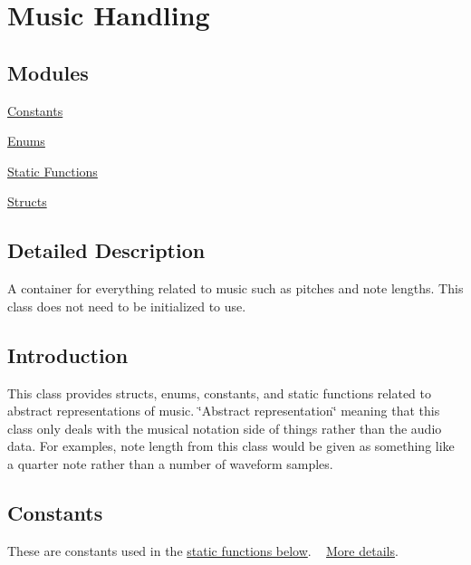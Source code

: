 \hypertarget{group___music_group}{}\section{Music Handling}
\label{group___music_group}
\subsection*{Modules}
\begin{DoxyCompactItemize}
\item 
\hyperlink{group___music_constants}{Constants}
\item 
\hyperlink{group___music_enums}{Enums}
\item 
\hyperlink{group___music_stat_func}{Static Functions}
\item 
\hyperlink{group___music_structs}{Structs}
\end{DoxyCompactItemize}


\subsection{Detailed Description}


A container for everything related to music such as pitches and note lengths. This class does not need to be initialized to use.\hypertarget{group___music_group_DocMusicIntro}{}\subsection{Introduction}\label{group___music_group_DocMusicIntro}
This class provides structs, enums, constants, and static functions related to abstract representations of music. \char`\"{}\+Abstract representation\char`\"{} meaning that this class only deals with the musical notation side of things rather than the audio data. For examples, note length from this class would be given as something like a quarter note rather than a number of waveform samples.

\begin{DoxyParagraph}{}

\end{DoxyParagraph}
\hypertarget{group___music_group_DocMusicConstants}{}\subsection{Constants}\label{group___music_group_DocMusicConstants}
These are constants used in the \hyperlink{group___music_stat_func}{static functions below}. ~\newline
 \hyperlink{group___music_constants}{More details}.

